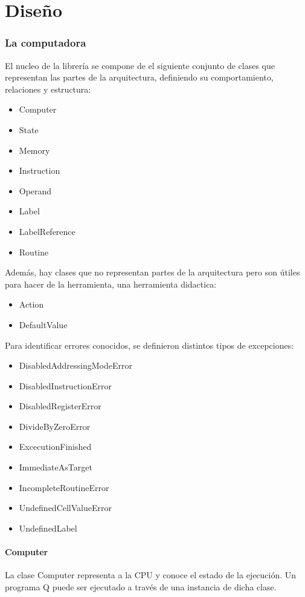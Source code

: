 \part{Diseño}
\label{disenio}

\section{La computadora}
El nucleo de la librería se compone de el siguiente conjunto de clases que representan las partes de la arquitectura, definiendo su comportamiento, relaciones y estructura:

\begin{itemize}
\item Computer
\item State
\item Memory
\item Instruction
\item Operand
\item Label
\item LabelReference
\item Routine
\end{itemize}

Además, hay clases que no representan partes de la arquitectura pero son útiles para hacer de la herramienta, una herramienta didactica:
\begin{itemize}
\item Action
\item DefaultValue
\end{itemize}

Para identificar errores conocidos, se definieron distintos tipos de excepciones:
\begin{itemize}
\item DisabledAddressingModeError
\item DisabledInstructionError
\item DisabledRegisterError
\item DivideByZeroError
\item ExcecutionFinished
\item ImmediateAsTarget
\item IncompleteRoutineError
\item UndefinedCellValueError
\item UndefinedLabel
\end{itemize}

\subsection{Computer}
La clase Computer representa a la CPU y conoce el estado de la ejecución. Un programa Q puede ser ejecutado a través de una instancia de dicha clase. 

